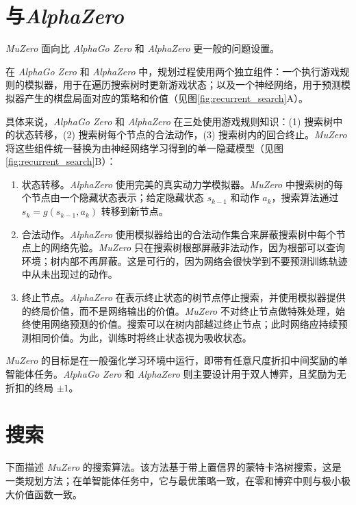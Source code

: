 \documentclass{article}
\newcommand{\muzero}{\emph{MuZero}}
\newcommand{\alphazero}{\emph{AlphaZero}}
\newcommand{\alphagozero}{\emph{AlphaGo Zero}}
\begin{document}
\begin{appendices}
\label{methods}


\section{与\alphazero}

\muzero{} 面向比 \alphagozero{}\cite{Silver17AG0} 和 \alphazero{}\cite{Silver18AZ} 更一般的问题设置。

在 \alphagozero{} 和 \alphazero{} 中，规划过程使用两个独立组件：一个执行游戏规则的模拟器，用于在遍历搜索树时更新游戏状态；以及一个神经网络，用于预测模拟器产生的棋盘局面对应的策略和价值（见图\ref{fig:recurrent_search}A）。

具体来说，\alphagozero{} 和 \alphazero{} 在三处使用游戏规则知识：(1) 搜索树中的状态转移，(2) 搜索树每个节点的合法动作，(3) 搜索树内的回合终止。\muzero{} 将这些组件统一替换为由神经网络学习得到的单一隐藏模型（见图\ref{fig:recurrent_search}B）：

\begin{enumerate}[1)]
\item 状态转移。\alphazero{} 使用完美的真实动力学模拟器。\muzero{} 中搜索树的每个节点由一个隐藏状态表示；给定隐藏状态 $s_{k-1}$ 和动作 $a_k$，搜索算法通过 $s_{k} = g(s_{k-1}, a_k)$ 转移到新节点。
\item 合法动作。\alphazero{} 使用模拟器给出的合法动作集合来屏蔽搜索树中每个节点上的网络先验。\muzero{} 只在搜索树根部屏蔽非法动作，因为根部可以查询环境；树内部不再屏蔽。这是可行的，因为网络会很快学到不要预测训练轨迹中从未出现过的动作。
\item 终止节点。\alphazero{} 在表示终止状态的树节点停止搜索，并使用模拟器提供的终局价值，而不是网络输出的价值。\muzero{} 不对终止节点做特殊处理，始终使用网络预测的价值。搜索可以在树内部越过终止节点；此时网络应持续预测相同价值。为此，训练时将终止状态视为吸收状态。
\end{enumerate}

\muzero{} 的目标是在一般强化学习环境中运行，即带有任意尺度折扣中间奖励的单智能体任务。\alphagozero{} 和 \alphazero{} 则主要设计用于双人博弈，且奖励为无折扣的终局 $\pm 1$。

\section{搜索}

下面描述 \muzero{} 的搜索算法。该方法基于带上置信界的蒙特卡洛树搜索，这是一类规划方法；在单智能体任务中，它与最优策略一致，在零和博弈中则与极小极大价值函数一致\cite{kocsis-sepesvari}。


\end{appendices}
\end{document}
